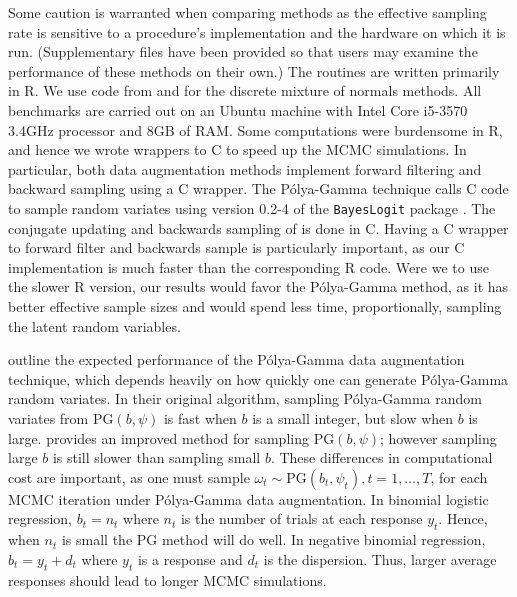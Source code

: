 \documentclass[12pt]{article}
\newcommand{\Polya}{P\'{o}lya}
\newcommand{\PG}{\text{PG}}
\begin{document}
Some caution is warranted when comparing methods as the effective sampling rate
is sensitive to a procedure's implementation and the hardware on which it is
run.  (Supplementary files have been provided so that users may examine the
performance of these methods on their own.)  The routines are written primarily
in R.  We use code from \cite{binomlogit-2012} and
\cite{fruhwirth-schnatter-book-2007} for the discrete mixture of normals
methods.  All benchmarks are carried out on an Ubuntu machine with Intel Core
i5-3570 3.4GHz processor and 8GB of RAM.  Some computations were burdensome in
R, and hence we wrote wrappers to C to speed up the MCMC simulations.  In
particular, both data augmentation methods implement forward filtering and
backward sampling using a C wrapper.  The \Polya-Gamma technique calls C code to
sample random variates using version 0.2-4 of the \texttt{BayesLogit} package
\citep{bayeslogit-2013}.  The conjugate updating and backwards sampling of
\cite{migon-etal-2013} is done in C.  Having a C wrapper to forward filter and
backwards sample is particularly important, as our C implementation is much
faster than the corresponding R code.  Were we to use the slower R version, our
results would favor the \Polya-Gamma method, as it has better effective sample
sizes and would spend less time, proportionally, sampling the latent random
variables.

\cite{polson-etal-2013} outline the expected performance of the \Polya-Gamma
data augmentation technique, which depends heavily on how quickly one can
generate \Polya-Gamma random variates.  In their original algorithm, sampling
\Polya-Gamma random variates from $\PG(b,\psi)$ is fast when $b$ is a small
integer, but slow when $b$ is large. \cite{windle-thesis-2013} provides an
improved method for sampling $\PG(b,\psi)$; however sampling large $b$ is still
slower than sampling small $b$.  These differences in computational cost are
important, as one must sample $\omega_t \sim \PG(b_t, \psi_t), t=1,\ldots,T$,
for each MCMC iteration under \Polya-Gamma data augmentation.  In binomial
logistic regression, $b_t = n_t$ where $n_t$ is the number of trials at each
response $y_t$.  Hence, when $n_t$ is small the PG method will do well.  In
negative binomial regression, $b_t = y_t + d_t$ where $y_t$ is a response and
$d_t$ is the dispersion.  Thus, larger average responses should lead to longer
MCMC simulations.
\end{document}
